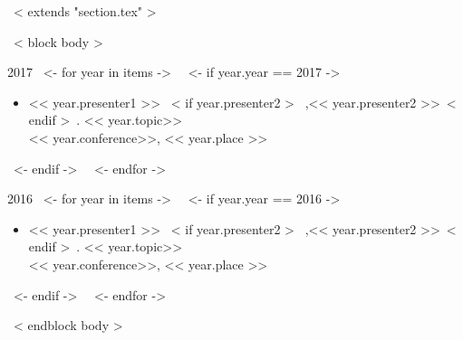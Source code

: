 ~< extends "section.tex" >~

~< block body >~

2017
~<- for year in items ->~
~<- if year.year == 2017 ->~
\begin{itemize}
  \item << year.presenter1 >> ~< if year.presenter2 >~
 ,<< year.presenter2 >>~< endif >~. << year.topic>> \\
  << year.conference>>, << year.place >>
\end{itemize}

~<- endif ->~
~<- endfor ->~

2016
~<- for year in items ->~
~<- if year.year == 2016 ->~
\begin{itemize}
  \item << year.presenter1 >> ~< if year.presenter2 >~
 ,<< year.presenter2 >>~< endif >~. << year.topic>> \\
  << year.conference>>, << year.place >>
\end{itemize}

~<- endif ->~
~<- endfor ->~


~< endblock body >~

